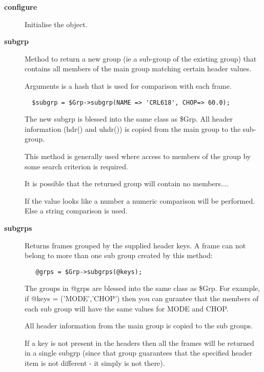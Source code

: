\begin{description}
\begin{description}
\begin{description}
\item[{\textbf{configure}}] \mbox{}

Initialise the object.


\item[{\textbf{subgrp}}] \mbox{}

Method to return a new group (ie a sub-group of the existing
group) that contains all members of the main group matching
certain header values.



Arguments is a hash that is used for comparison with each
frame.

\begin{verbatim}
  $subgrp = $Grp->subgrp(NAME => 'CRL618', CHOP=> 60.0);
\end{verbatim}


The new subgrp is blessed into the same class as \$Grp.
All header information (hdr() and uhdr()) is copied
from the main group to the sub-group.



This method is generally used where access to members of the
group by some search criterion is required.



It is possible that the returned group will contain no
members....



If the value looks like a number a numeric comparison will be performed.
Else a string comparison is used.


\item[{\textbf{subgrps}}] \mbox{}

Returns frames grouped by the supplied header keys.
A frame can not belong to more than one sub group created by this
method:

\begin{verbatim}
   @grps = $Grp->subgrps(@keys);
\end{verbatim}


The groups in @grps are blessed into the same class as \$Grp.
For example, if @keys = ('MODE','CHOP') then you can gurantee
that the members of each sub group will have the same values
for MODE and CHOP.



All header information from the main group is copied to the
sub groups.



If a key is not present in the headers then all the frames
will be returned in a single subgrp (since that group guarantees
that the specified header item is not different - it simply
is not there).




\end{description}
\end{description}
\end{description}
